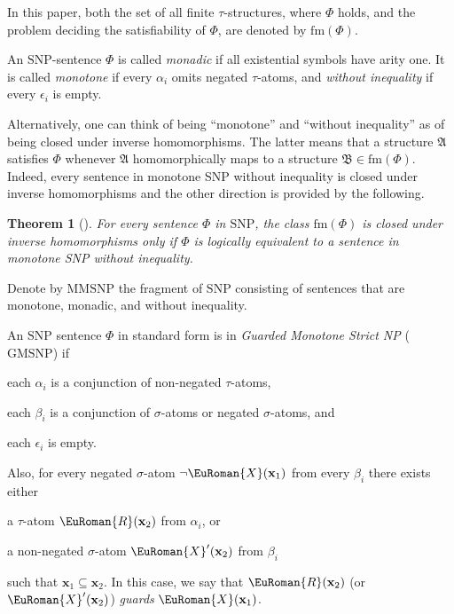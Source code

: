 \documentclass[10pt,a4paper]{amsart}
\theoremstyle{plain}
\newtheorem{thmC}[thm]{Theorem}
\theoremstyle{definition}
\numberwithin{equation}{section}
\newcommand{\eurm}[1]{\EuRoman{#1}} %
\newcommand{\structure}[1]{\mathfrak{#1}} %
\newcommand{\tuple}[1]{\mathbf{#1}} %
\newcommand{\rel}[1]{\eurm{#1}} %
\newcommand{\Sat}[0]{\ensuremath{\mathrm{fm}}}
\newcommand{\SNP}[0]{\textrm{SNP}}
\newcommand{\MMSNP}[0]{\textrm{MMSNP}}
\newcommand{\GMSNP}[0]{\textrm{GMSNP}}
\begin{document}
In this paper, both the set of all finite $\tau$-structures, where $\Phi$ holds, and the problem deciding the satisfiability of $\Phi$, are denoted by $\Sat(\Phi)$.






An $\SNP$-sentence $\Phi$ is called \emph{monadic} if all existential symbols have arity one.
%
It is called \emph{monotone} if every $\alpha_i$ omits negated $\tau$-atoms, and \emph{without inequality} if every $\epsilon_i$ is empty.

Alternatively, one can think of being ``monotone'' and ``without inequality'' as of being closed under
inverse homomorphisms. The latter means that a structure $\structure{A}$ satisfies $\Phi$ whenever $\structure{A}$ homomorphically maps to a structure $\structure{B}\in\Sat(\Phi)$.
Indeed, every sentence in monotone SNP without inequality is closed under inverse homomorphisms and the other direction is provided by the following.
\begin{thmC}[\cite{federV03}]\label{th:monotone-hom-closed} 
For every sentence $\Phi$ in $\SNP$, the class $\Sat(\Phi)$ is closed under inverse homomorphisms only if $\Phi$ is logically equivalent to a sentence in monotone SNP without inequality.
\end{thmC}

Denote by $\MMSNP$ the fragment of $\SNP$ consisting of sentences that are monotone, monadic, and without inequality.

An $\SNP$ sentence $\Phi$ in standard form is in \emph{Guarded Monotone Strict NP} ($\GMSNP$) if
\begin{inparaenum}[(a)]
\item each $\alpha_i$ is a conjunction of non-negated $\tau$-atoms,
\item each $\beta_i$ is a conjunction of $\sigma$-atoms or negated $\sigma$-atoms, and
\item each $\epsilon_i$ is empty.
\end{inparaenum}
Also, for every negated $\sigma$-atom $\neg \rel{X}(\tuple{x}_1)$ from every $\beta_i$ there exists either
\begin{inparaenum}[(i)]
\item a $\tau$-atom $\rel{R}(\tuple{x}_2)$ from $\alpha_i$, or
\item a non-negated $\sigma$-atom $\rel{X}'(\tuple{x}_2)$ from $\beta_i$
\end{inparaenum}  
such that $\tuple{x}_1\subseteq\tuple{x}_2$.
In this case, we say that $\rel{R}(\tuple{x}_2)$ (or $\rel{X}'(\tuple{x}_2)$) \emph{guards} $\rel{X}(\tuple{x}_1)$.
\end{document}
